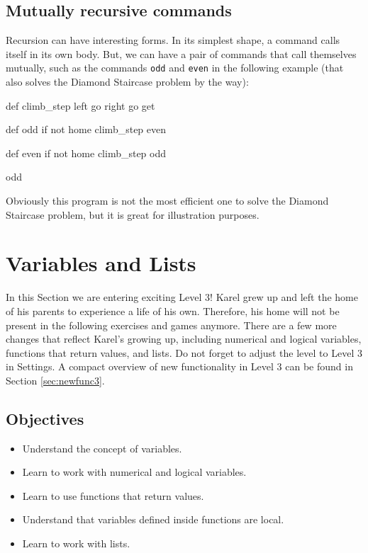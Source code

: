 \subsection{Mutually recursive commands}

Recursion can have interesting forms. In its simplest shape, a command 
calls itself in its own body. But, we can have a pair of commands
that call themselves mutually, such as the commands {\tt odd} and 
{\tt even} in the following example (that also solves the Diamond Staircase
problem by the way):
 
\begin{bluecode}
def climb_step
    left
    go
    right
    go
    get 

def odd
    if not home
        climb_step
        even
    
def even
    if not home
        climb_step
        odd
    
odd
\end{bluecode}
Obviously this program is not the most efficient one to solve the 
Diamond Staircase problem, but it is great for illustration purposes.


\section{Variables and Lists} \label{sec:var}

In this Section we are entering exciting Level 3! Karel grew up and left the home of his 
parents to experience a life of his own. Therefore, his home will not be present
in the following exercises and games anymore. There are a few more changes
that reflect Karel's growing up, including numerical and logical variables,
functions that return values, and lists. Do not forget to adjust the level 
to Level 3 in Settings. A compact overview of new functionality in Level 3 
can be found in Section \ref{sec:newfunc3}.

\subsection{Objectives} 
 
\begin{itemize}
\item Understand the concept of variables.
\item Learn to work with numerical and logical variables.
\item Learn to use functions that return values. 
\item Understand that variables defined inside functions are local. 
\item Learn to work with lists.
\end{itemize}

